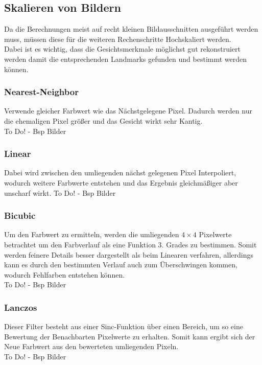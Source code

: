 \subsection{Skalieren von Bildern}
Da die Berechnungen meist auf recht kleinen Bildausschnitten ausgeführt werden muss, müssen diese für die weiteren Rechenschritte Hochskaliert werden.\\
Dabei ist es wichtig, dass die Gesichtsmerkmale möglichst gut rekonstruiert werden damit die entsprechenden Landmarks gefunden und bestimmt werden können.
\subsubsection{Nearest-Neighbor}
Verwende gleicher Farbwert wie das Nächstgelegene Pixel. Dadurch werden nur die ehemaligen Pixel größer und das Gesicht wirkt sehr Kantig.\\
To Do! - Bsp Bilder
\subsubsection{Linear}
Dabei wird zwischen den umliegenden nächst gelegenen Pixel Interpoliert, wodurch weitere Farbwerte entstehen und das Ergebnis gleichmäßiger aber unscharf wirkt.
To Do! - Bsp Bilder
\subsubsection{Bicubic}
Um den Farbwert zu ermitteln, werden die umliegenden $4\times 4$ Pixelwerte betrachtet um den Farbverlauf als eine Funktion 3. Grades zu bestimmen. Somit werden feinere Details besser dargestellt als beim Linearen verfahren, allerdings kann es durch den bestimmten Verlauf auch zum Überschwingen kommen, wodurch Fehlfarben entstehen können.\\
To Do! - Bsp Bilder
\subsubsection{Lanczos}
Dieser Filter besteht aus einer Sinc-Funktion über einen Bereich, um so eine Bewertung der Benachbarten Pixelwerte zu erhalten. Somit kann ergibt sich der Neue Farbwert aus den bewerteten umliegenden Pixeln.\\
To Do! - Bsp Bilder

